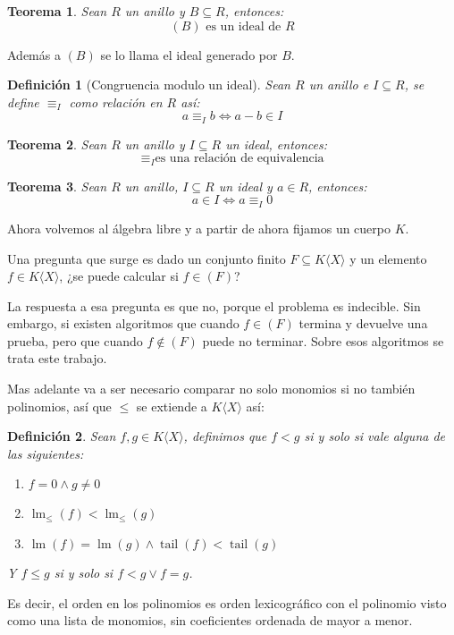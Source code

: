 \documentclass{amsbook} %
\theoremstyle{customstyle}
\newtheorem{definition}{Definición}[chapter]
\newtheorem{theorem}{Teorema}[chapter]
\theoremstyle{factstyle}
\DeclareMathOperator{\lm}{lm}
\DeclareMathOperator{\tail}{tail}
\begin{document}
\begin{theorem}
Sean $R$ un anillo y $B ⊆ R$, entonces:
\[ (B)\text{ es un ideal de }R \]

\end{theorem}

Además a $(B)$ se lo llama el ideal generado por $B$.

\begin{definition}[Congruencia modulo un ideal]\label{def:congruencia mod ideal}
Sean $R$ un anillo e $I ⊆ R$, se define $≡_I$ como relación en $R$ así:
\[ a ≡_I b ⇔ a - b ∈ I \]
\end{definition}

\begin{theorem}\label{thm:congruencia mod ideal es equivalencia}
Sean $R$ un anillo y $I ⊆ R$ un ideal, entonces:
\[ ≡_I \text{es una relación de equivalencia} \]
\end{theorem}

\begin{theorem}\label{thm:en ideal ⇔ congruente 0}
Sean $R$ un anillo, $I ⊆ R$ un ideal y $a ∈ R$, entonces:
\[ a ∈ I ⇔ a ≡_I 0 \]
\end{theorem}

Ahora volvemos al álgebra libre y a partir de ahora fijamos un cuerpo $K$.

Una pregunta que surge es dado un conjunto finito $F ⊆ K⟨X⟩$ y un elemento $f ∈ K⟨X⟩$, ¿se puede calcular si $f ∈ (F)$?

La respuesta a esa pregunta es que no, porque el problema es indecible. Sin embargo, si existen algoritmos que cuando $f ∈ (F)$ termina y devuelve una prueba, pero que cuando $f ∉ (F)$ puede no terminar. Sobre esos algoritmos se trata este trabajo.

Mas adelante va a ser necesario comparar no solo monomios si no también polinomios, así que $≤$ se extiende a $K⟨X⟩$ así:

\begin{definition}
Sean $f, g ∈  K⟨X⟩$, definimos que $f < g$ si y solo si vale alguna de las siguientes:
\begin{enumerate}
\item $f = 0 ∧ g ≠ 0$
\item $\lm_≤(f) < \lm_≤(g)$
\item $\lm(f) = \lm(g) ∧ \tail(f) < \tail(g)$
\end{enumerate}
Y $f ≤ g$ si y solo si $f < g ∨ f = g$.
\end{definition}

Es decir, el orden en los polinomios es orden lexicográfico con el polinomio visto como una lista de monomios, sin coeficientes ordenada de mayor a menor.
\end{document}
